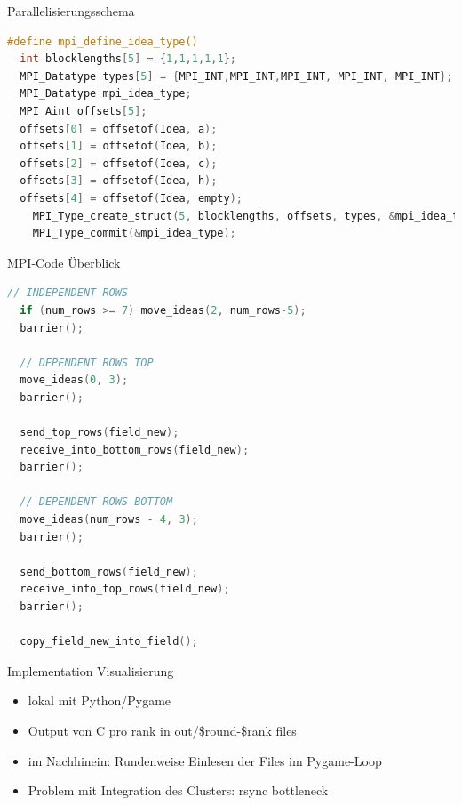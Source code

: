 \begin{frame}[fragile]{Parallelisierungsschema}
\begin{lstlisting}[language=C,basicstyle=\small,breaklines=true,keywordstyle=\color{black}]
#define mpi_define_idea_type()                                               
  int blocklengths[5] = {1,1,1,1,1};                                  
  MPI_Datatype types[5] = {MPI_INT,MPI_INT,MPI_INT, MPI_INT, MPI_INT};       
  MPI_Datatype mpi_idea_type;                                                
  MPI_Aint offsets[5];                                                   
  offsets[0] = offsetof(Idea, a);                                            
  offsets[1] = offsetof(Idea, b);                                            
  offsets[2] = offsetof(Idea, c);                                            
  offsets[3] = offsetof(Idea, h);                                            
  offsets[4] = offsetof(Idea, empty);                                        
    MPI_Type_create_struct(5, blocklengths, offsets, types, &mpi_idea_type); 
    MPI_Type_commit(&mpi_idea_type);                                         
\end{lstlisting}
\end{frame}

\begin{frame}[fragile]{MPI-Code Überblick}
\begin{lstlisting}[language=C,basicstyle=\tiny,breaklines=true,keywordstyle=\color{black}]
  // INDEPENDENT ROWS
  if (num_rows >= 7) move_ideas(2, num_rows-5);
  barrier();

  // DEPENDENT ROWS TOP
  move_ideas(0, 3); 
  barrier();

  send_top_rows(field_new);
  receive_into_bottom_rows(field_new);
  barrier();

  // DEPENDENT ROWS BOTTOM
  move_ideas(num_rows - 4, 3);  
  barrier();

  send_bottom_rows(field_new);
  receive_into_top_rows(field_new);
  barrier();

  copy_field_new_into_field();
\end{lstlisting}
\end{frame}

\begin{frame}{Implementation Visualisierung}
	\begin{itemize}
		\item lokal mit Python/Pygame
		\item Output von C pro rank in out/\$round-\$rank files
		\item im Nachhinein: Rundenweise Einlesen der Files im Pygame-Loop
		\item Problem mit Integration des Clusters: rsync bottleneck
	\end{itemize}
\end{frame}

